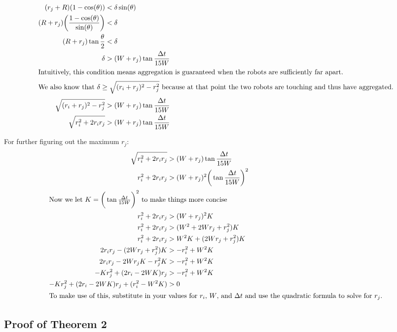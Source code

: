 \documentclass[conference]{IEEEtran}
\begin{document}
{\begin{align*}
        (r_j+R)(1 - \cos(\theta)) &< \delta\sin(\theta) \\
        (R+r_j)\bigg(\frac{1 - \cos(\theta)}{\sin(\theta)}\bigg) &< \delta \\
        (R+r_j)\tan{\frac{\theta}{2}} &< \delta \\
        \delta &> (W+r_j)\tan{\frac{\Delta t}{15W}} \\
        \intertext{Intuitively, this condition means aggregation is guaranteed when the robots are sufficiently far apart.}
        \intertext{We also know that $\delta\geq\sqrt{(r_i+r_j)^2-r^2_j}$ because at that point the two robots are touching and thus have aggregated.}
        \sqrt{(r_i+r_j)^2 - r^2_j} &> (W+r_j)\tan{\frac{\Delta t}{15W}} \\
        \sqrt{r^2_i + 2r_ir_j} &> (W+r_j)\tan{\frac{\Delta t}{15W}} \\
      \end{align*}
    }

    \pagebreak
    For further figuring out the maximum $r_j$:
    \begin{align*}
        \sqrt{r^2_i + 2r_ir_j} &> (W+r_j)\tan{\frac{\Delta t}{15W}} \\
        r^2_i + 2r_ir_j &> (W+r_j)^2\bigg(\tan{\frac{\Delta t}{15W}}\bigg)^2 \\
        \intertext{Now we let $K=\bigg(\tan{\frac{\Delta t}{15W}}\bigg)^2$ to make things more concise}
        r^2_i + 2r_ir_j &> (W+r_j)^2K \\
        r^2_i + 2r_ir_j &> (W^2+2Wr_j+r_j^2)K \\
        r^2_i + 2r_ir_j &> W^2K+(2Wr_j+r_j^2)K \\
        2r_ir_j - (2Wr_j+r_j^2)K&> -r^2_i + W^2K \\
        2r_ir_j - 2Wr_jK-r_j^2K&> -r^2_i + W^2K \\
        -Kr_j^2 + (2r_i - 2WK)r_j &> -r^2_i + W^2K \\
        -Kr_j^2 + (2r_i - 2WK)r_j + (r^2_i - W^2K) &> 0\\
      \intertext{To make use of this, substitute in your values for $r_i$, $W$, and $\Delta t$ and use the quadratic formula to solve for $r_j$.}
    \end{align*}

  \subsection{Proof of Theorem 2} \label{thm:2}
\end{document}
